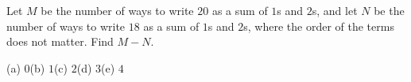 Let $M$ be the number of ways to write $20$ as a sum of $1$s and $2$s, and let $N$ be the number of ways to write $18$ as a sum of $1$s and $2$s, where the order of the terms does not matter. Find $M-N$.

(a) $0$\quad (b) $1$\quad (c) $2$\quad (d) $3$\quad (e) $4$
